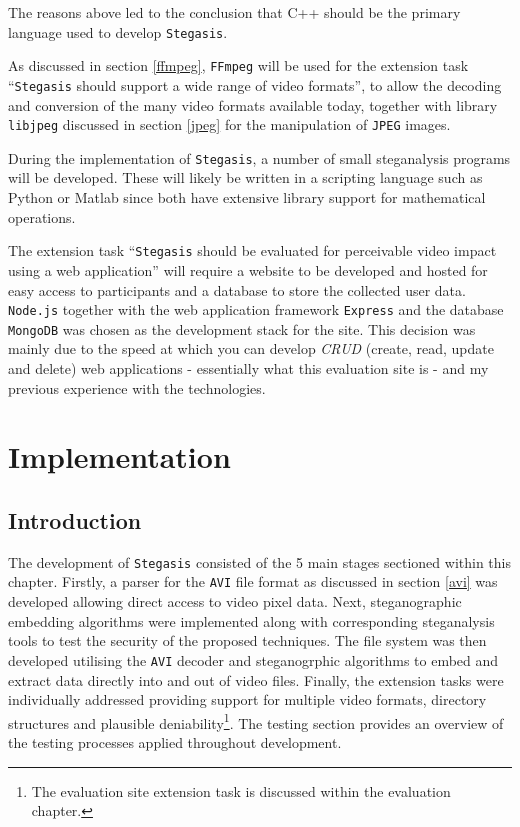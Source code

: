 \documentclass[paper=a4, fontsize=11pt,twoside]{scrartcl}
\numberwithin{table}{section}
\numberwithin{figure}{section}
\numberwithin{algorithm}{section}
\begin{document}
The reasons above led to the conclusion that C++ should be the primary language used to develop \texttt{Stegasis}.

As discussed in section \ref{ffmpeg}, \texttt{FFmpeg} will be used for the extension task ``\texttt{Stegasis} should support a wide range of video formats'', to allow the decoding and conversion of the many video formats available today, together with library \texttt{libjpeg} discussed in section \ref{jpeg} for the manipulation of \texttt{JPEG} images. 

During the implementation of \texttt{Stegasis}, a number of small steganalysis programs will be developed. These will likely be written in a scripting language such as Python or Matlab since both have extensive library support for mathematical operations.

The extension task ``\texttt{Stegasis} should be evaluated for perceivable video impact using a web application'' will require a website to be developed and hosted for easy access to participants and a database to store the collected user data. \texttt{Node.js} together with the web application framework \texttt{Express} and the database \texttt{MongoDB} was chosen as the development stack for the site. This decision was mainly due to the speed at which you can develop \textit{CRUD} (create, read, update and delete) web applications - essentially what this evaluation site is - and my previous experience with the technologies.


\section{Implementation}

\subsection{Introduction}

The development of \texttt{Stegasis} consisted of the 5 main stages sectioned within this chapter. Firstly, a parser for the \texttt{AVI} file format as discussed in section \ref{avi} was developed allowing direct access to video pixel data. Next, steganographic embedding algorithms were implemented along with corresponding steganalysis tools to test the security of the proposed techniques. The file system was then developed utilising the \texttt{AVI} decoder and steganogrphic algorithms to embed and extract data directly into and out of video files. Finally, the extension tasks were individually addressed providing support for multiple video formats, directory structures and plausible deniability\footnote{The evaluation site extension task is discussed within the evaluation chapter.}. The testing section provides an overview of the testing processes applied throughout development. 
\end{document}
